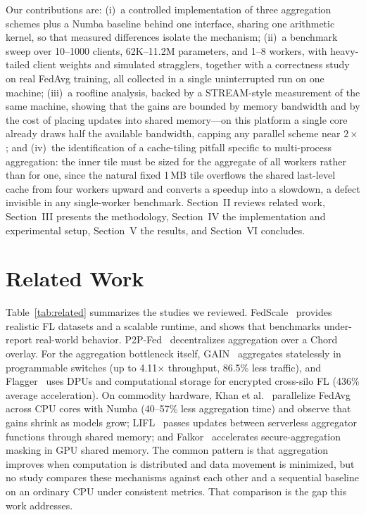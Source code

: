 \documentclass[conference]{IEEEtran}
\begin{document}
Our contributions are: (i)~a controlled implementation of three aggregation schemes plus a Numba baseline behind one interface, sharing one arithmetic kernel, so that measured differences isolate the mechanism; (ii)~a benchmark sweep over 10--1000 clients, 62K--11.2M parameters, and 1--8 workers, with heavy-tailed client weights and simulated stragglers, together with a correctness study on real FedAvg training, all collected in a single uninterrupted run on one machine; (iii)~a roofline analysis, backed by a STREAM-style measurement of the same machine, showing that the gains are bounded by memory bandwidth and by the cost of placing updates into shared memory---on this platform a single core already draws half the available bandwidth, capping any parallel scheme near $2\times$; and (iv)~the identification of a cache-tiling pitfall specific to multi-process aggregation: the inner tile must be sized for the aggregate of all workers rather than for one, since the natural fixed 1\,MB tile overflows the shared last-level cache from four workers upward and converts a speedup into a slowdown, a defect invisible in any single-worker benchmark. Section~II reviews related work, Section~III presents the methodology, Section~IV the implementation and experimental setup, Section~V the results, and Section~VI concludes.

\section{Related Work}
Table~\ref{tab:related} summarizes the studies we reviewed. FedScale~\cite{fedscale} provides realistic FL datasets and a scalable runtime, and shows that benchmarks under-report real-world behavior. P2P-Fed~\cite{p2pfed} decentralizes aggregation over a Chord overlay. For the aggregation bottleneck itself, GAIN~\cite{gain} aggregates statelessly in programmable switches (up to 4.11$\times$ throughput, 86.5\% less traffic), and Flagger~\cite{flagger} uses DPUs and computational storage for encrypted cross-silo FL (436\% average acceleration). On commodity hardware, Khan et al.~\cite{khan2023} parallelize FedAvg across CPU cores with Numba (40--57\% less aggregation time) and observe that gains shrink as models grow; LIFL~\cite{lifl} passes updates between serverless aggregator functions through shared memory; and Falkor~\cite{falkor} accelerates secure-aggregation masking in GPU shared memory. The common pattern is that aggregation improves when computation is distributed and data movement is minimized, but no study compares these mechanisms against each other and a sequential baseline on an ordinary CPU under consistent metrics. That comparison is the gap this work addresses.
\end{document}
